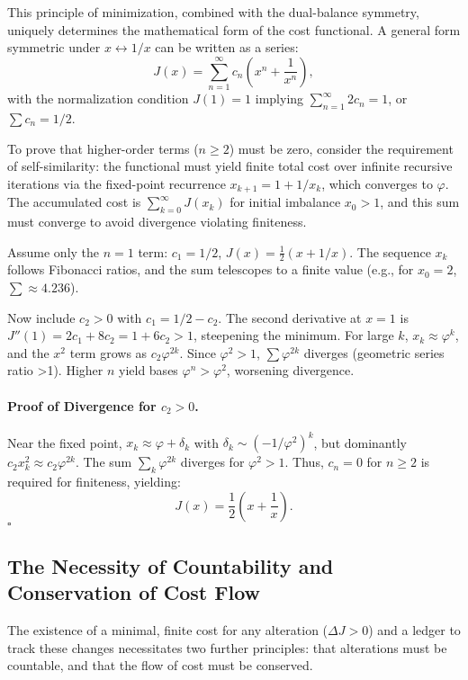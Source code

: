 This principle of minimization, combined with the dual-balance symmetry, uniquely determines the mathematical form of the cost functional. A general form symmetric under \(x \leftrightarrow 1/x\) can be written as a series:
\begin{equation}
J(x) = \sum_{n=1}^{\infty} c_n \left( x^n + \frac{1}{x^n} \right),
\end{equation}
with the normalization condition \(J(1)=1\) implying \(\sum_{n=1}^{\infty} 2c_n = 1\), or \(\sum c_n = 1/2\).

To prove that higher-order terms (\(n \geq 2\)) must be zero, consider the requirement of self-similarity: the functional must yield finite total cost over infinite recursive iterations via the fixed-point recurrence \(x_{k+1} = 1 + 1/x_k\), which converges to \(\varphi\). The accumulated cost is \(\sum_{k=0}^{\infty} J(x_k)\) for initial imbalance \(x_0 > 1\), and this sum must converge to avoid divergence violating finiteness.

Assume only the \(n=1\) term: \(c_1 = 1/2\), \(J(x) = \frac{1}{2} (x + 1/x)\). The sequence \(x_k\) follows Fibonacci ratios, and the sum telescopes to a finite value (e.g., for \(x_0=2\), \(\sum \approx 4.236\)).

Now include \(c_2 > 0\) with \(c_1 = 1/2 - c_2\). The second derivative at \(x=1\) is \(J''(1) = 2c_1 + 8c_2 = 1 + 6c_2 > 1\), steepening the minimum. For large \(k\), \(x_k \approx \varphi^k\), and the \(x^2\) term grows as \(c_2 \varphi^{2k}\). Since \(\varphi^2 > 1\), \(\sum \varphi^{2k}\) diverges (geometric series ratio >1). Higher \(n\) yield bases \(\varphi^n > \varphi^2\), worsening divergence.

\paragraph{Proof of Divergence for \(c_2 > 0\).} Near the fixed point, \(x_k \approx \varphi + \delta_k\) with \(\delta_k \sim (-1/\varphi^2)^k\), but dominantly \(c_2 x_k^2 \approx c_2 \varphi^{2k}\). The sum \(\sum_k \varphi^{2k}\) diverges for \(\varphi^2 > 1\). Thus, \(c_n = 0\) for \(n \geq 2\) is required for finiteness, yielding:
\begin{equation}
\boxed{J(x) = \frac{1}{2}\left(x + \frac{1}{x}\right)}.
\end{equation}
\hfill$\square$

\subsection{The Necessity of Countability and Conservation of Cost Flow}
The existence of a minimal, finite cost for any alteration (\(\Delta J > 0\)) and a ledger to track these changes necessitates two further principles: that alterations must be countable, and that the flow of cost must be conserved.

